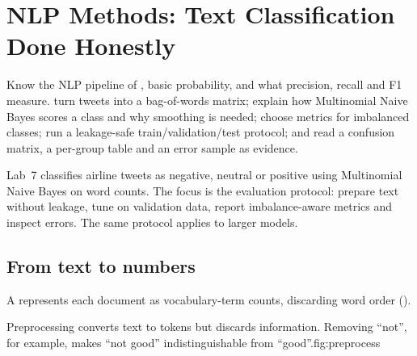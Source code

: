 \chapter{NLP Methods: Text Classification Done Honestly}
\label{ch:nlp-methods}

\chapterguide%
  {Know the NLP pipeline of , basic probability, and what precision, recall and F1 measure.}
  {turn tweets into a bag-of-words matrix; explain how Multinomial Naive Bayes scores a class and why smoothing is needed; choose metrics for imbalanced classes; run a leakage-safe train/validation/test protocol; and read a confusion matrix, a per-group table and an error sample as evidence.}

Lab~7 classifies airline tweets as negative, neutral or positive using Multinomial Naive Bayes on word counts. The focus is the evaluation protocol: prepare text without leakage, tune on validation data, report imbalance-aware metrics and inspect errors. The same protocol applies to larger models.

\section{From text to numbers}

A  represents each document as vocabulary-term counts, discarding word order ().

\begin{aifig}{Preprocessing converts text to tokens but discards information. Removing ``not'', for example, makes ``not good'' indistinguishable from ``good''.}{fig:preprocess}
\end{aifig}


